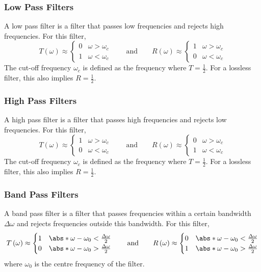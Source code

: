 \documentclass{article}
\begin{document}
\subsubsection{Low Pass Filters}
A low pass filter is a filter that passes low frequencies and rejects
high frequencies. For this filter,
\begin{equation*}
    T\left( \omega \right) \approx
    \begin{cases}
        0 & \omega > \omega_c \\
        1 & \omega < \omega_c
    \end{cases}
    \qquad \text{and} \qquad
    R\left( \omega \right) \approx
    \begin{cases}
        1 & \omega > \omega_c \\
        0 & \omega < \omega_c
    \end{cases}
\end{equation*}
The cut-off frequency \(\omega_c\) is defined as the frequency where
\(T = \frac{1}{2}\). For a lossless filter, this also implies
\(R = \frac{1}{2}\).
\subsubsection{High Pass Filters}
A high pass filter is a filter that passes high frequencies and rejects
low frequencies. For this filter,
\begin{equation*}
    T\left( \omega \right) \approx
    \begin{cases}
        1 & \omega > \omega_c \\
        0 & \omega < \omega_c
    \end{cases}
    \qquad \text{and} \qquad
    R\left( \omega \right) \approx
    \begin{cases}
        0 & \omega > \omega_c \\
        1 & \omega < \omega_c
    \end{cases}
\end{equation*}
The cut-off frequency \(\omega_c\) is defined as the frequency where
\(T = \frac{1}{2}\). For a lossless filter, this also implies
\(R = \frac{1}{2}\).
\subsubsection{Band Pass Filters}
A band pass filter is a filter that passes frequencies within a certain
bandwidth \(\Delta{\omega}\) and rejects frequencies outside this
bandwidth. For this filter,
\begin{equation*}
    T\left( \omega \right) \approx
    \begin{cases}
        1 & \abs*{\omega - \omega_0} < \frac{\Delta{\omega}}{2} \\
        0 & \abs*{\omega - \omega_0} > \frac{\Delta{\omega}}{2}
    \end{cases}
    \qquad \text{and} \qquad
    R\left( \omega \right) \approx
    \begin{cases}
        0 & \abs*{\omega - \omega_0} < \frac{\Delta{\omega}}{2} \\
        1 & \abs*{\omega - \omega_0} > \frac{\Delta{\omega}}{2}
    \end{cases}
\end{equation*}
where \(\omega_0\) is the centre frequency of the filter.
\end{document}
